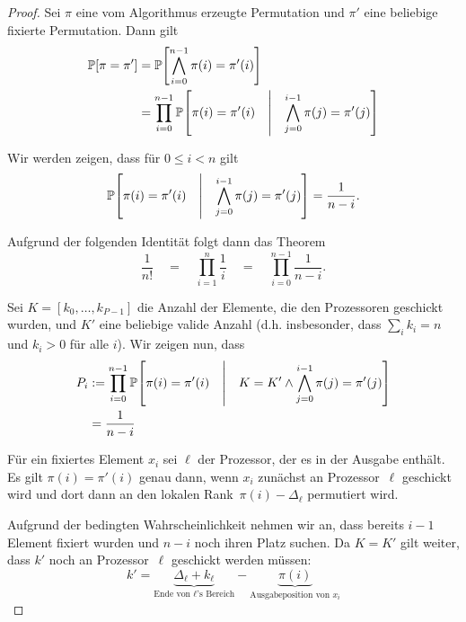 \iffalse
    \begin{proof}
        Sei $\pi$ eine vom Algorithmus erzeugte Permutation und $\pi'$ eine beliebige fixierte Permutation.
        Dann gilt
        \begin{align}
            \mathbb{P}\!\left[\pi = \pi'\right] & = \mathbb{P}\!\left[\bigwedge\limits_{i=0}^{n-1} \pi(i) = \pi'(i)\right]                                                        \\
                              & = \prod_{i=0}^{n-1} \mathbb{P}\!\left[\pi(i) = \pi'(i) \quad\middle|\quad \bigwedge\limits_{j=0}^{i-1} \pi(j) = \pi'(j) \right]
        \end{align}

        \noindent
        Wir werden zeigen, dass für $0 \le i < n$ gilt
        \begin{equation}
            \mathbb{P}\!\left[\pi(i) = \pi'(i) \quad\middle|\quad \bigwedge\limits_{j=0}^{i-1} \pi(j) = \pi'(j) \right] = \frac{1}{n - i}.
        \end{equation}

        \noindent
        Aufgrund der folgenden Identität folgt dann das Theorem
        \begin{equation}
            \frac{1}{n!}
            \quad = \quad \prod_{i=1}^{n} \frac{1}{i}
            \quad = \quad \prod_{i=0}^{n-1}\frac{1}{n-i}.
        \end{equation}

        Sei $K = [k_0, \ldots, k_{P-1}]$ die Anzahl der Elemente, die den Prozessoren geschickt wurden, und $K'$ eine beliebige valide Anzahl (d.h. insbesonder, dass $\sum_i k_i = n$ und $k_i > 0$ für alle $i$).
        Wir zeigen nun, dass
        \begin{align}
            P_i & := \prod_{i=0}^{n-1} \mathbb{P}\!\left[\pi(i) = \pi'(i) \quad\middle|\quad K = K' \land \bigwedge\limits_{j=0}^{i-1} \pi(j) = \pi'(j) \right] \\
                & = \frac{1}{n - i}
        \end{align}

        Für ein fixiertes Element $x_i$ sei $\ell$ der Prozessor, der es in der Ausgabe enthält.
        Es gilt $\pi(i) = \pi'(i)$ genau dann, wenn $x_i$ zunächst an Prozessor~$\ell$ geschickt wird und dort dann an den lokalen Rank~$\pi(i) - \Delta_\ell$ permutiert wird.

        Aufgrund der bedingten Wahrscheinlichkeit nehmen wir an, dass bereits $i-1$ Element fixiert wurden und $n-i$ noch ihren Platz suchen.
        Da $K = K'$ gilt weiter, dass $k'$ noch an Prozessor~$\ell$ geschickt werden müssen:
        \begin{equation}
            k' = \underbrace{\Delta_\ell + k_\ell}_\text{Ende von $\ell$'s Bereich} - \underbrace{\pi(i)}_\text{Ausgabeposition von $x_i$}
        \end{equation}


\end{proof}
